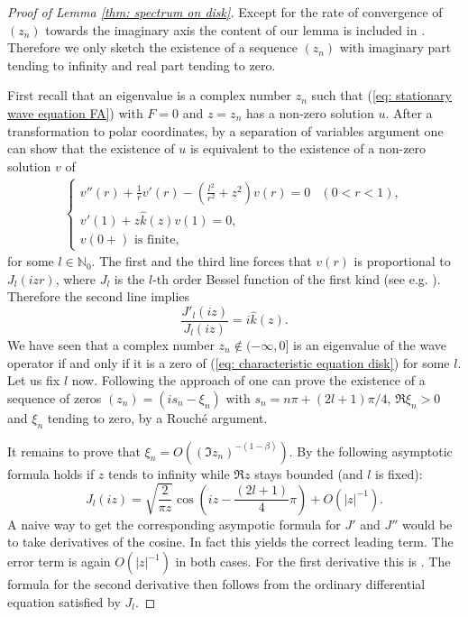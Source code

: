 \documentclass{amsart}
\newcommand{\abs}[1]{\left|#1\right|}
\newcommand{\khat}{\hat{k}}
\newcommand{\N}{\mathbb{N}}
\begin{document}
\begin{proof}[Proof of Lemma \ref{thm: spectrum on disk}]
 Except for the rate of convergence of $(z_n)$ towards the imaginary axis the content of our lemma is included in \cite[Theorem 5.2]{DFMP2010b}. Therefore we only sketch the existence of a sequence $(z_n)$ with imaginary part tending to infinity and real part tending to zero. 
 
 First recall that an eigenvalue is a complex number $z_n$ such that (\ref{eq: stationary wave equation FA}) with $F=0$ and $z=z_n$ has a non-zero solution $u$. After a transformation to polar coordinates, by a separation of variables argument one can show that the existence of $u$ is equivalent to the existence of a non-zero solution $v$ of 
 \begin{align*}
  \begin{cases}
   v''(r) + \frac{1}{r}v'(r) - (\frac{l^2}{r^2}+z^2)v(r) = 0 & (0 < r < 1), \\
   v'(1) + z\khat(z) v(1) = 0, & \\
   v(0+) \text{ is finite},
  \end{cases}
 \end{align*}
 for some $l\in\N_0$. The first and the third line forces that $v(r)$ is proportional to $J_l(izr)$, where $J_l$ is the $l$-th order Bessel function of the first kind (see e.g. \cite[Chapter 9]{AbramowitzStegun}). Therefore the second line implies
 \begin{equation}\label{eq: characteristic equation disk}
  \frac{J'_l(iz)}{J_l(iz)} = i\khat(z) .
 \end{equation}
 We have seen that a complex number $z_n\notin (-\infty, 0]$ is an eigenvalue of the wave operator if and only if it is a zero of (\ref{eq: characteristic equation disk}) for some $l$. Let us fix $l$ now. Following the approach of \cite{DFMP2010b} one can prove the existence of a sequence of zeros $(z_n)=(i s_n - \xi_n)$ with $s_n=n\pi + (2l+1)\pi/4$, $\Re\xi_n>0$ and $\xi_n$ tending to zero, by a Rouch\'e argument.
 
 It remains to prove that $\xi_n=O((\Im z_n)^{-(1-\beta)})$. By \cite[Formula 9.2.1]{AbramowitzStegun} the following asymptotic formula holds if $z$ tends to infinity while $\Re z$ stays bounded (and $l$ is fixed):
 \begin{equation}\label{eq: asymptotic expansion Bessel function}
  J_l(iz) = \sqrt{\frac{2}{\pi z}} \cos\left(iz - \frac{(2l+1)}{4}\pi\right) + O(\abs{z}^{-1}) .
 \end{equation}
 A naive way to get the corresponding asympotic formula for $J'$ and $J''$ would be to take derivatives of the cosine. In fact this yields the correct leading term. The error term is again $O(\abs{z}^{-1})$ in both cases. For the first derivative this is \cite[Formula 9.2.11]{AbramowitzStegun}. The formula for the second derivative then follows from the ordinary differential equation satisfied by $J_l$.
 

\end{proof}
\end{document}
